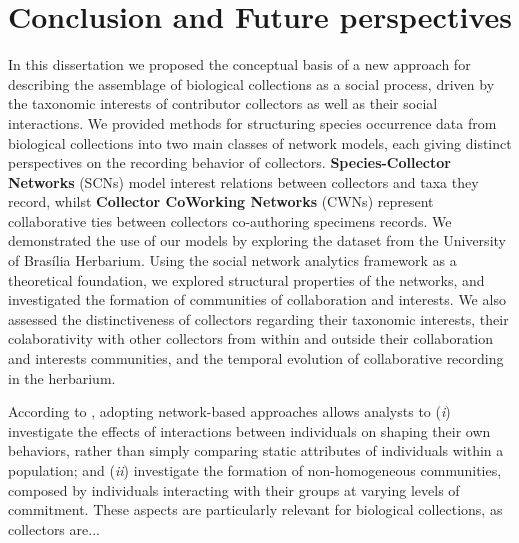 \chapter{Conclusion and Future perspectives}\label{conclusion_perspectives}


In this dissertation we proposed the conceptual basis of a new approach for describing the assemblage of biological collections as a social process, driven by the taxonomic interests of contributor collectors as well as their social interactions.
We provided methods for structuring species occurrence data from biological collections into two main classes of network models, each giving distinct perspectives on the recording behavior of collectors.
\textbf{Species-Collector Networks} (SCNs) model interest relations between collectors and taxa they record, whilst \textbf{Collector CoWorking Networks} (CWNs) represent collaborative ties between collectors co-authoring specimens records. 
We demonstrated the use of our models by exploring the dataset from the University of Brasília Herbarium.
Using the social network analytics framework \cite{Barbier2011,Stork2015} as a theoretical foundation, we explored structural properties of the networks, 
and investigated the formation of communities of collaboration and interests.
We also assessed the distinctiveness of collectors regarding their taxonomic interests, their colaborativity with other collectors from within and outside their collaboration and interests communities, and the temporal evolution of collaborative recording in the herbarium.

According to \cite{Marin2011}, adopting network-based approaches allows analysts to
(\textit{i}) investigate the effects of interactions between individuals on shaping their own behaviors, rather than simply comparing static attributes of individuals within a population; and
(\textit{ii}) investigate the formation of non-homogeneous communities, composed by individuals interacting with their groups at varying levels of commitment.
These aspects are particularly relevant for biological collections, as collectors are...

